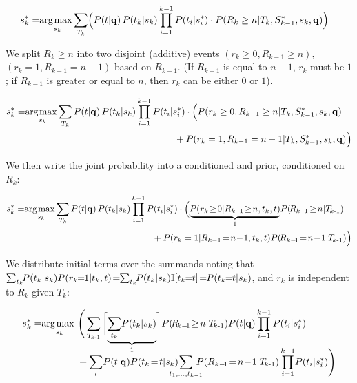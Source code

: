 \begin{align}
  s_k^* = & \argmax_{s_k} \!\sum_{T_k} \Bigl( P(t|\vec{q}) \,P(t_k|s_k) \prod_{i=1}^{k-1} P(t_i|s_i^*) \cdot P(R_k\geq n|T_k,S_{k-1}^*,s_k,\vec{q}) \Bigr) \nonumber 
\end{align}

We split $R_k \geq n$ into two disjoint (additive) events
$(r_k \! \geq \! 0, R_{k\!-\!1}\!\geq \!n)$, $(r_k\!\!=\!\!1, R_{k\!-\!1}\!\!=\!\!n\!-\!1)$ based on $R_{k-1}$. (If $R_{k-1}$ is equal to $n\!-\!1$, $r_k$ must be $1$; if $R_{k-1}$ is greater or equal to $n$, then $r_k$ can be either $0$ or $1$). 

\begin{align}
 s_k^* = & \argmax_{s_k} \!\sum_{T_k} P(t|\vec{q}) \,P(t_k|s_k) \prod_{i=1}^{k-1} P(t_i|s_i^*) \cdot \Bigl( P(r_k\geq 0, R_{k-1}\geq n|T_k,S_{k-1}^*,s_k,\vec{q}) \nonumber \\
  & \hspace{56mm} + P(r_k = 1, R_{k-1} = n-1|T_k,S_{k-1}^*,s_k,\vec{q}) \Big) \nonumber 
\end{align}

We then write the joint probability into a conditioned and prior, conditioned on $R_k$:

\begin{align}
 s_k^* = & \argmax_{s_k} \!\sum_{T_k} P(t|\vec{q}) \,P(t_k|s_k) \prod_{i=1}^{k-1} P(t_i|s_i^*) \cdot \Bigl( \mbox{$\underbrace{P(r_k\!\geq\!0|R_{k-\!1}\!\geq\!n,t_k,t)}_{1}$} P(\!R_{k-\!1}\!\geq\!n|\TlessK) \nonumber \\
  & \hspace{50mm} + P(r_k=1|R_{k-1}\!=\!n\!-\!1,t_k,t) P(\!R_{k-\!1}\!=\!n\!-\!1|\TlessK) \Big) \nonumber 
\end{align}

We distribute initial terms over the summands noting that 
$\sum_{t_k} \!\! P(t_k|s_k) P(r_k\!\!=\!\!1|t_k,t) \! = \!\! \sum_{t_k} \!\! P(t_k|s_k) \I[t_k\!\!=\!\!t] \! = \!\! P(t_k\!\!=\!\!t|s_k)$,
and $r_k$ is independent to $R_k$ given $T_k$:

\begin{align}
 s_k^* = & \argmax_{s_k} \Bigg( \sum_{\TlessK} \bigg[ \mbox{$\underbrace{ \sum_{t_k} \!P(t_k|s_k) }_{1}$} \bigg] P(\!R_{\!k-\!1}\!\geq\!n|\TlessK) P(t|\vec{q}) \prod_{i=1}^{k-1} P(t_i|s_i^*) \nonumber \\[-3.5mm]
  & \hspace{13mm} + \sum_{t} \!P(t|\vec{q}) P(t_k\!=\!t|s_k) \hspace{-4mm} \sum_{t_1, \dots, t_{k-1}} \hspace{-3mm} P(R_{k-\!1}\!=\!n\!-\!1|\TlessK) \prod_{i=1}^{k-1} \!P(t_i|s_i^*) \Bigg) \nonumber
\end{align}

